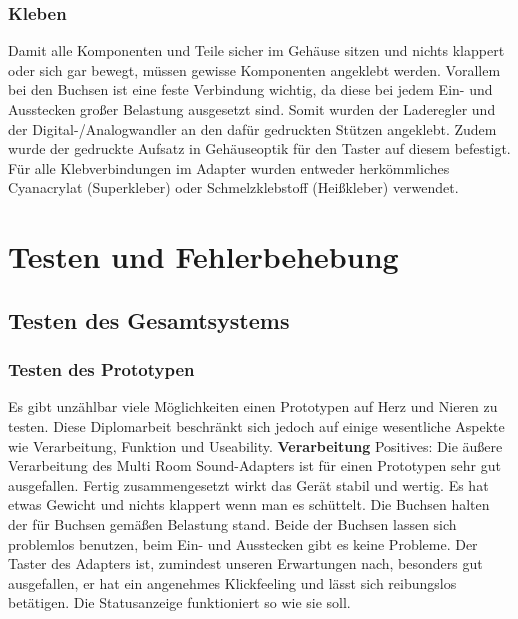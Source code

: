 \documentclass[]{article}
\begin{document}
\subsubsection{Kleben}
Damit alle Komponenten und Teile sicher im Gehäuse sitzen und nichts klappert oder sich gar bewegt, müssen gewisse Komponenten angeklebt werden. Vorallem bei den Buchsen ist eine feste Verbindung wichtig, da diese bei jedem Ein- und Ausstecken großer Belastung ausgesetzt sind. Somit wurden der Laderegler und der Digital-/Analogwandler an den dafür gedruckten Stützen angeklebt. Zudem wurde der gedruckte Aufsatz in Gehäuseoptik für den Taster auf diesem befestigt. Für alle Klebverbindungen im Adapter wurden entweder herkömmliches Cyanacrylat (Superkleber) oder Schmelzklebstoff (Heißkleber) verwendet.

\section{Testen und Fehlerbehebung}
\subsection{Testen des Gesamtsystems}
\subsubsection{Testen des Prototypen}
Es gibt unzählbar viele Möglichkeiten einen Prototypen auf Herz und Nieren zu testen. Diese Diplomarbeit beschränkt sich jedoch auf einige wesentliche Aspekte wie Verarbeitung, Funktion und Useability.
\vspace{4mm}\newline
\textbf{Verarbeitung}
\vspace{4mm}\newline
Positives:\newline
Die äußere Verarbeitung des Multi Room Sound-Adapters ist für einen Prototypen sehr gut ausgefallen. Fertig zusammengesetzt wirkt das Gerät stabil und wertig. Es hat etwas Gewicht und nichts klappert wenn man es schüttelt. Die Buchsen halten der für Buchsen gemäßen Belastung stand. Beide der Buchsen lassen sich problemlos benutzen, beim Ein- und Ausstecken gibt es keine Probleme. Der Taster des Adapters ist, zumindest unseren Erwartungen nach, besonders gut ausgefallen, er hat ein angenehmes Klickfeeling und lässt sich reibungslos betätigen. Die Statusanzeige funktioniert so wie sie soll.
\end{document}
